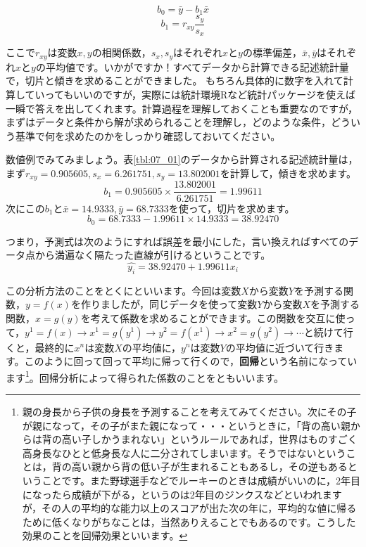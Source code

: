 \documentclass{ltjbook}
\begin{document}
\[ b_0 = \bar{y}-b_1\bar{x} \]
\[ b_1 = r_{xy}\frac{s_y}{s_x} \]

ここで$r_{xy}$は変数$x,y$の相関係数，$s_x,s_y$はそれぞれ$x$と$y$の標準偏差，$\bar{x},\bar{y}$はそれぞれ$x$と$y$の平均値です。いかがですか！すべてデータから計算できる記述統計量で，切片と傾きを求めることができました。
もちろん具体的に数字を入れて計算していってもいいのですが，実際には統計環境Rなど統計パッケージを使えば一瞬で答えを出してくれます。計算過程を理解しておくことも重要なのですが，まずはデータと条件から解が求められることを理解し，どのような条件，どういう基準で何を求めたのかをしっかり確認しておいてください。

数値例でみてみましょう。表\ref{tbl:07_01}のデータから計算される記述統計量は，まず$r_{xy}=0.905605,s_x=6.261751,s_y=13.802001$を計算して，傾きを求めます。
\[ b_1 = 0.905605 \times \frac{13.802001}{6.261751} = 1.99611 \]
次にこの$b_1$と$\bar{x} = 14.9333,\bar{y}=68.7333$を使って，切片を求めます。
\[ b_0 = 68.7333 - 1.99611 \times 14.9333 = 38.92470 \]

つまり，予測式は次のようにすれば誤差を最小にした，言い換えればすべてのデータ点から満遍なく隔たった直線が引けるということです。
\[ \hat{y_i} = 38.92470 + 1.99611 x_i \]

この分析方法のことをとくにといいます。今回は変数$X$から変数$Y$を予測する関数，$y=f(x)$を作りましたが，同じデータを使って変数$Y$から変数$X$を予測する関数，$x=g(y)$を考えて係数を求めることができます。この関数を交互に使って，$y^1 = f(x) \to x^1 = g(y^1) \to y^2 = f(x^1) \to x^2 = g(y^2) \to \cdots $と続けて行くと，最終的に$x^n$は変数$X$の平均値に，$y^n$は変数$Y$の平均値に近づいて行きます。このように回って回って平均に帰って行くので，\textbf{回帰}という名前になっています\footnote{親の身長から子供の身長を予測することを考えてみてください。次にその子が親になって，その子がまた親になって・・・というときに，「背の高い親からは背の高い子しかうまれない」というルールであれば，世界はものすごく高身長なひとと低身長な人に二分されてしまいます。そうではないということは，背の高い親から背の低い子が生まれることもあるし，その逆もあるということです。また野球選手などでルーキーのときは成績がいいのに，2年目になったら成績が下がる，というのは2年目のジンクスなどといわれますが，その人の平均的な能力以上のスコアが出た次の年に，平均的な値に帰るために低くなりがちなことは，当然ありえることでもあるのです。こうした効果のことを回帰効果といいます。}。回帰分析によって得られた係数のことをともいいます。
\end{document}
